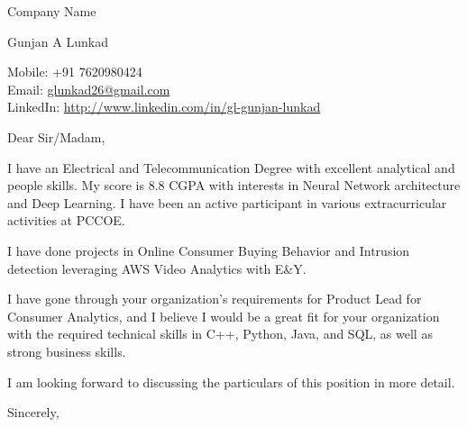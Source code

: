 \documentclass[a4paper,12pt]{letter}
\begin{document}
\begin{letter}{Company Name}

    \begin{center}
        Gunjan A Lunkad
    \end{center}

    \begin{flushright}
        Mobile: +91 7620980424 \\
        Email: \href{mailto:glunkad26@gmail.com}{glunkad26@gmail.com} \\
        LinkedIn: \href{http://www.linkedin.com/in/gl-gunjan-lunkad}{http://www.linkedin.com/in/gl-gunjan-lunkad}
    \end{flushright}

    \opening{Dear Sir/Madam,}

    I have an Electrical and Telecommunication Degree with excellent analytical and people skills. My score is 8.8 CGPA with interests in Neural Network architecture and Deep Learning. I have been an active participant in various extracurricular activities at PCCOE.

    I have done projects in Online Consumer Buying Behavior and Intrusion detection leveraging AWS Video Analytics with E\&Y.

    I have gone through your organization's requirements for Product Lead for Consumer Analytics, and I believe I would be a great fit for your organization with the required technical skills in C++, Python, Java, and SQL, as well as strong business skills.

    I am looking forward to discussing the particulars of this position in more detail.

    \closing{Sincerely, }
    \vspace{2cm}  %



\end{letter}
\end{document}
